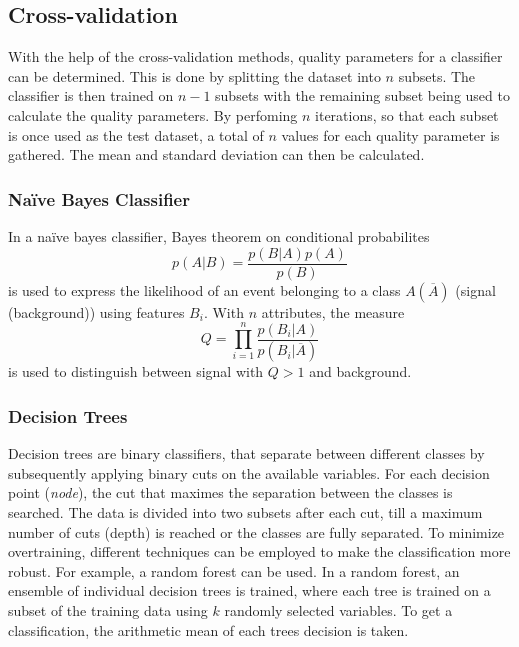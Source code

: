 \subsection{Cross-validation}
\label{sec:cross-validation}
With the help of the cross-validation methods, quality parameters for a classifier can be determined. This is done by splitting the dataset into $n$ subsets. The classifier is then trained on $n-1$ subsets with the
remaining subset being used to calculate the quality parameters. By perfoming $n$ iterations, so that each subset is once used as the test dataset, a total of $n$ values for each quality parameter is
gathered. The mean and standard deviation can then be calculated.

\subsubsection{Na\"ive Bayes Classifier}
\label{subsec:Bayes}
In a na\"ive bayes classifier, Bayes theorem on conditional probabilites
\begin{equation}
    p(A|B) = \frac{p(B|A)p(A)}{p(B)}
    \label{eq:Bayes}
\end{equation}
is used to express the likelihood of an event belonging to a class $A(\overline{A})$ (signal (background)) using features $B_i$.
With $n$ attributes, the measure 
\begin{equation}
    Q = \prod_{i=1}^{n} \frac{p(B_i|A)}{p(B_i|\overline{A})}
\end{equation}
is used to distinguish between signal with $Q > 1$ and background.

\subsubsection{Decision Trees}
\label{subsec:decision_trees}
Decision trees are binary classifiers, that separate between different classes by subsequently applying binary cuts on the available variables. 
For each decision point (\textit{node}), the cut that maximes the separation between the classes is searched. The data is divided into two subsets after each cut, till a
maximum number of cuts (depth) is reached or the classes are fully separated.
To minimize overtraining, different techniques can be employed to make the classification more robust. 
For example, a random forest can be used. In a random forest, an ensemble of individual decision trees is trained, where each tree is trained on a subset of the training data
using $k$ randomly selected variables. To get a classification, the arithmetic mean of each trees decision is taken.

